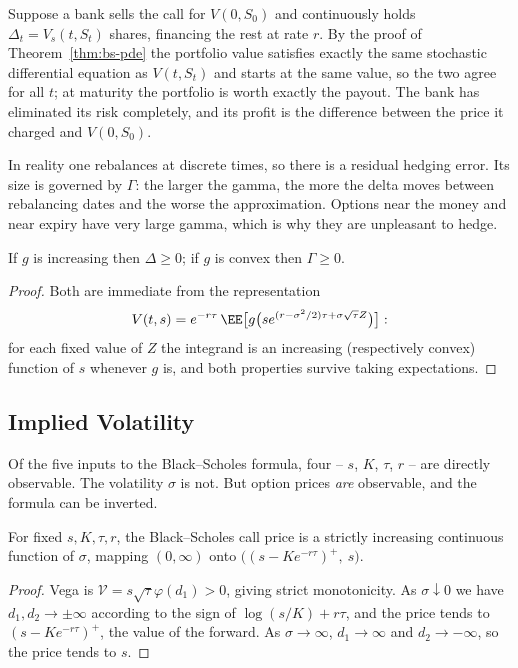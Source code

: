 \begin{remark}
	Suppose a bank sells the call for $V(0,S_0)$ and continuously holds $\Delta_t = V_s(t,S_t)$ shares, financing the rest at rate $r$. By the proof of Theorem~\ref{thm:bs-pde} the portfolio value satisfies exactly the same stochastic differential equation as $V(t,S_t)$ and starts at the same value, so the two agree for all $t$; at maturity the portfolio is worth exactly the payout. The bank has eliminated its risk completely, and its profit is the difference between the price it charged and $V(0,S_0)$.

	In reality one rebalances at discrete times, so there is a residual hedging error. Its size is governed by $\Gamma$: the larger the gamma, the more the delta moves between rebalancing dates and the worse the approximation. Options near the money and near expiry have very large gamma, which is why they are unpleasant to hedge.
\end{remark}

\begin{proposition}[Monotonicity]
	If $g$ is increasing then $\Delta \geq 0$; if $g$ is convex then $\Gamma \geq 0$.
\end{proposition}

\begin{proof}
	Both are immediate from the representation
	$$
	V(t,s) = e^{-r\tau}\,\EE\big[g\big(se^{(r-\sigma^2/2)\tau+\sigma\sqrt\tau Z}\big)\big]:
	$$
	for each fixed value of $Z$ the integrand is an increasing (respectively convex) function of $s$ whenever $g$ is, and both properties survive taking expectations.
\end{proof}

\subsection{Implied Volatility}

Of the five inputs to the Black--Scholes formula, four -- $s$, $K$, $\tau$, $r$ -- are directly observable. The volatility $\sigma$ is not. But option prices \emph{are} observable, and the formula can be inverted.

\begin{proposition}
	For fixed $s,K,\tau,r$, the Black--Scholes call price is a strictly increasing continuous function of $\sigma$, mapping $(0,\infty)$ onto $\big((s - Ke^{-r\tau})^+,\ s\big)$.
\end{proposition}

\begin{proof}
	Vega is $\mathcal{V} = s\sqrt\tau\varphi(d_1) > 0$, giving strict monotonicity. As $\sigma\downarrow0$ we have $d_1,d_2\to\pm\infty$ according to the sign of $\log(s/K) + r\tau$, and the price tends to $(s-Ke^{-r\tau})^+$, the value of the forward. As $\sigma\to\infty$, $d_1\to\infty$ and $d_2\to-\infty$, so the price tends to $s$.
\end{proof}


